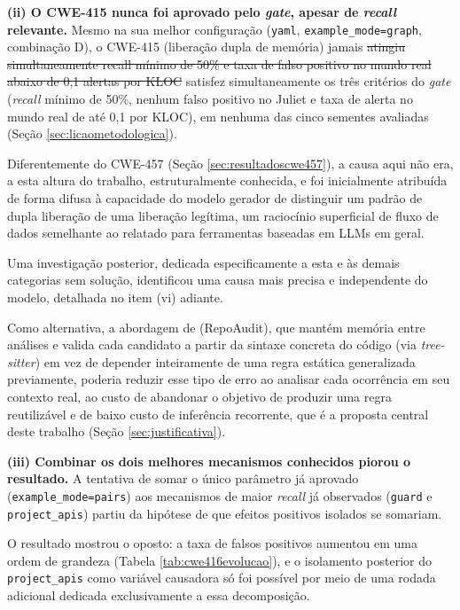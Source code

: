 \documentclass[
    12pt,                %
    openright,           %
    oneside,             %
    a4paper,             %
    english,             %
    brazil               %
]{abntex2}
\newcommand{\antigo}[1]{\sout{#1}}
\newcommand{\novo}[1]{{\color{red}#1}}
\begin{document}
\par
\textbf{(ii) O CWE-415 nunca foi aprovado pelo \textit{gate}, apesar de \textit{recall} relevante.}
Mesmo na sua melhor configuração (\texttt{yaml}, \texttt{example\_mode=graph}, combinação D), o CWE-415 (liberação dupla de memória) jamais \antigo{atingiu simultaneamente recall mínimo de 50\% e taxa de falso positivo no mundo real abaixo de 0,1 alertas por KLOC} \novo{satisfez simultaneamente os três critérios do \textit{gate} (\textit{recall} mínimo de 50\%, nenhum falso positivo no Juliet e taxa de alerta no mundo real de até 0,1 por KLOC)}, em nenhuma das cinco sementes avaliadas (Seção \ref{sec:licaometodologica}).
\par
Diferentemente do CWE-457 (Seção \ref{sec:resultadoscwe457}), a causa aqui não era, a esta altura do trabalho, estruturalmente conhecida, e foi inicialmente atribuída de forma difusa à capacidade do modelo gerador de distinguir um padrão de dupla liberação de uma liberação legítima, um raciocínio superficial de fluxo de dados semelhante ao relatado para ferramentas baseadas em LLMs em geral.
\par
Uma investigação posterior, dedicada especificamente a esta e às demais categorias sem solução, identificou uma causa mais precisa e independente do modelo, detalhada no item (vi) adiante.
\par
Como alternativa, a abordagem de  (RepoAudit), que mantém memória entre análises e valida cada candidato a partir da sintaxe concreta do código (via \textit{tree-sitter}) em vez de depender inteiramente de uma regra estática generalizada previamente, poderia reduzir esse tipo de erro ao analisar cada ocorrência em seu contexto real, ao custo de abandonar o objetivo de produzir uma regra reutilizável e de baixo custo de inferência recorrente, que é a proposta central deste trabalho (Seção \ref{sec:justificativa}).
\par
\textbf{(iii) Combinar os dois melhores mecanismos conhecidos piorou o resultado.}
A tentativa de somar o único parâmetro já aprovado (\texttt{example\_mode=pairs}) aos mecanismos de maior \textit{recall} já observados (\texttt{guard} e \texttt{project\_apis}) partiu da hipótese de que efeitos positivos isolados se somariam.
\par
O resultado mostrou o oposto: a taxa de falsos positivos aumentou em uma ordem de grandeza (Tabela \ref{tab:cwe416evolucao}), e o isolamento posterior do \texttt{project\_apis} como variável causadora só foi possível por meio de uma rodada adicional dedicada exclusivamente a essa decomposição.
\end{document}
